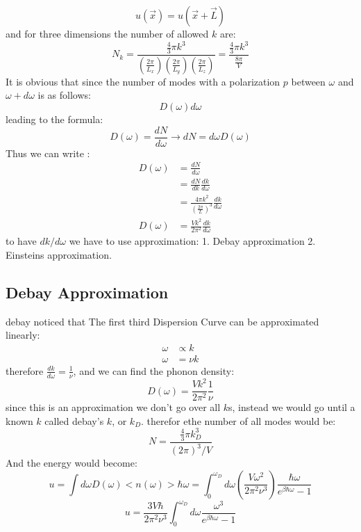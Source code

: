\documentclass[9pt,a4paper, twocolumn]{article}
\begin{document}
     \begin{equation}
        u(\vec x) = u(\vec x+\vec L)
     \end{equation}
     and for three dimensions the number of allowed $k$ are:
     \begin{equation}
        N_k = \frac{\frac43 \pi k^3}{\left(
            \frac{2\pi}{L_x}
        \right)\left(
            \frac{2\pi}{L_y}
        \right)\left(
            \frac{2\pi}{L_z}
        \right)} =\frac{\frac43 \pi k^3}{\frac{8\pi}{V}}
     \end{equation}  
     It is obvious that since the number of modes with a polarization $p$ between $\omega$ and $\omega +d\omega$ is as follows:
     \begin{equation}
        D(\omega)d\omega
     \end{equation}
     leading to the formula:
     \begin{equation}
        D(\omega) = \frac{dN}{d\omega} \rightarrow dN = d\omega D(\omega)
     \end{equation}
     Thus we can write :
     \begin{align}
        D(\omega) &= \frac{dN}{d\omega} \\
        &= \frac{dN}{dk}\frac{dk}{d\omega} \\
        &= \frac{4\pi k^2}{\left(\frac{2\pi}{L}\right)^3}\frac{dk}{d\omega}\\
        D(\omega)&=\frac{Vk^2}{2\pi^2}\frac{dk}{d\omega}
     \end{align}
     to have $dk/d\omega$ we have to use approximation: 1. Debay approximation 2. Einsteins approximation.
     \subsection{Debay Approximation}
     debay noticed that The first third Dispersion Curve can be approximated linearly:
     \begin{align}
        \omega &\propto k \\
        \omega &= \nu k
     \end{align}
     therefore $\frac{dk}{d\omega} =\frac1\nu$, and we can find the phonon density:
     \begin{equation}
        D(\omega) = \frac{Vk^2}{2\pi^2}\frac1\nu
     \end{equation}
     since this is an approximation we don't go over all $k$s, instead we would go until a known $k$ called debay's $k$, or $k_D$. therefor ethe number of all modes would be:
     \begin{equation}
        N = \frac{\frac43 \pi k^3_D}{(2\pi)^3/V} 
     \end{equation} 
     And the energy would become:
     \begin{equation}
        u =\int d\omega D(\omega) <n(\omega)> \hbar \omega = \int_0^{\omega_D}d\omega \left(\frac{V \omega^2}{2\pi^2 \nu^3}\right) \frac{\hbar \omega}{e^{\beta\hbar \omega} - 1}
     \end{equation}
     \begin{equation}
        u = \frac{3V\hbar}{2\pi^2\nu^3}\int_0^{\omega_D}d\omega\frac{\omega^3}{e^{\beta\hbar\omega}- 1}
     \end{equation}
     
\end{document}
